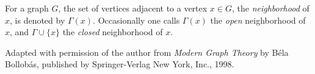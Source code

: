 \documentclass[12pt]{article}
\begin{document}
For a graph $G$, the set of vertices adjacent to a vertex $x \in G$, the \emph{neighborhood} of $x$, is denoted by $\Gamma(x)$. Occasionally one calls $\Gamma(x)$ the \emph{open} neighborhood of $x$, and $\Gamma \cup \{x\}$ the \emph{closed} neighborhood of $x$.


\footnotesize{Adapted with permission of the author from \emph{Modern Graph Theory} by B\'{e}la Bollob\'{a}s, published by Springer-Verlag New York, Inc., 1998.}
\end{document}
